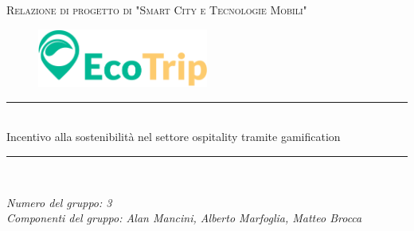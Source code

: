 \documentclass[12pt]{article}
\begin{document}

\begin{titlepage}

\newcommand{\HRule}{\rule{\linewidth}{0.5mm}}

\center

\textsc{\Large Relazione di progetto di "Smart City e Tecnologie Mobili"}\\[0.5cm]

\begin{figure}[H]
  \includegraphics[width=0.5\textwidth]{logo.png}
  \centering
\end{figure}

\HRule \\[0.5cm]
{ \large Incentivo alla sostenibilità nel settore ospitality tramite gamification}\\[0.4cm]
\HRule \\[1.5cm]

\vfill

\begin{flushleft}
\emph{Numero del gruppo: 3}\\[1cm]
\emph{Componenti del gruppo: Alan Mancini, Alberto Marfoglia, Matteo Brocca}\\[3cm]
\end{flushleft}



\end{titlepage}


\tableofcontents

\newpage

 









%
%
\end{document}
